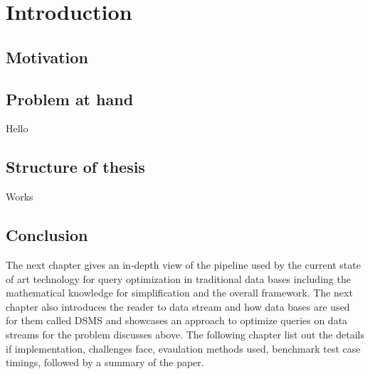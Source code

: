 \chapter{Introduction}
\label{chapter:Introduction}
\thispagestyle{myheadings}

\section{Motivation}
\label{sec:Motivation}

\section{Problem at hand}
\label{sec:Problem at hand}
Hello
\section{Structure of thesis}
\label{sec:Structure of thesis}
Works
\section{Conclusion}
\label{sec:Conclusion}
The next chapter gives an in-depth view of the pipeline used by the current state of art technology for query optimization in traditional data bases including the mathematical knowledge for simplification and the overall framework. The next chapter also introduces the reader to data stream and how data bases are used for them called DSMS and showcases an approach to optimize queries on data streams for the problem discusses above. The following chapter list out the details if implementation, challenges face, evaulation methods used, benchmark test case timings, followed by a summary of the paper.
